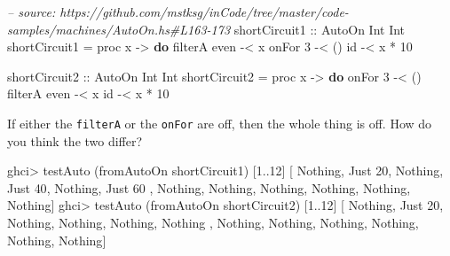 \documentclass[]{article}
\newenvironment{Shaded}{}{}
\newcommand{\KeywordTok}[1]{\textcolor[rgb]{0.00,0.44,0.13}{\textbf{{#1}}}}
\newcommand{\DataTypeTok}[1]{\textcolor[rgb]{0.56,0.13,0.00}{{#1}}}
\newcommand{\DecValTok}[1]{\textcolor[rgb]{0.25,0.63,0.44}{{#1}}}
\newcommand{\CommentTok}[1]{\textcolor[rgb]{0.38,0.63,0.69}{\textit{{#1}}}}
\newcommand{\OtherTok}[1]{\textcolor[rgb]{0.00,0.44,0.13}{{#1}}}
\newcommand{\FunctionTok}[1]{\textcolor[rgb]{0.02,0.16,0.49}{{#1}}}
\newcommand{\NormalTok}[1]{{#1}}
\begin{document}
\begin{Shaded}
\begin{Highlighting}[]
\CommentTok{-- source: https://github.com/mstksg/inCode/tree/master/code-samples/machines/AutoOn.hs#L163-173}
\OtherTok{shortCircuit1 ::} \DataTypeTok{AutoOn} \DataTypeTok{Int} \DataTypeTok{Int}
\NormalTok{shortCircuit1 }\FunctionTok{=} \NormalTok{proc x }\OtherTok{->} \KeywordTok{do}
    \NormalTok{filterA even }\FunctionTok{-<} \NormalTok{x}
    \NormalTok{onFor }\DecValTok{3}      \FunctionTok{-<} \NormalTok{()}
    \NormalTok{id           }\FunctionTok{-<} \NormalTok{x }\FunctionTok{*} \DecValTok{10}

\OtherTok{shortCircuit2 ::} \DataTypeTok{AutoOn} \DataTypeTok{Int} \DataTypeTok{Int}
\NormalTok{shortCircuit2 }\FunctionTok{=} \NormalTok{proc x }\OtherTok{->} \KeywordTok{do}
    \NormalTok{onFor }\DecValTok{3}      \FunctionTok{-<} \NormalTok{()}
    \NormalTok{filterA even }\FunctionTok{-<} \NormalTok{x}
    \NormalTok{id           }\FunctionTok{-<} \NormalTok{x }\FunctionTok{*} \DecValTok{10}
\end{Highlighting}
\end{Shaded}

If either the \texttt{filterA} or the \texttt{onFor} are off, then the
whole thing is off. How do you think the two differ?

\begin{Shaded}
\begin{Highlighting}[]
\NormalTok{ghci}\FunctionTok{>} \NormalTok{testAuto (fromAutoOn shortCircuit1) [}\DecValTok{1}\FunctionTok{..}\DecValTok{12}\NormalTok{]}
\NormalTok{[ }\DataTypeTok{Nothing}\NormalTok{, }\DataTypeTok{Just} \DecValTok{20}\NormalTok{, }\DataTypeTok{Nothing}\NormalTok{, }\DataTypeTok{Just} \DecValTok{40}\NormalTok{, }\DataTypeTok{Nothing}\NormalTok{, }\DataTypeTok{Just} \DecValTok{60}
\NormalTok{, }\DataTypeTok{Nothing}\NormalTok{, }\DataTypeTok{Nothing}\NormalTok{, }\DataTypeTok{Nothing}\NormalTok{, }\DataTypeTok{Nothing}\NormalTok{, }\DataTypeTok{Nothing}\NormalTok{, }\DataTypeTok{Nothing}\NormalTok{]}
\NormalTok{ghci}\FunctionTok{>} \NormalTok{testAuto (fromAutoOn shortCircuit2) [}\DecValTok{1}\FunctionTok{..}\DecValTok{12}\NormalTok{]}
\NormalTok{[ }\DataTypeTok{Nothing}\NormalTok{, }\DataTypeTok{Just} \DecValTok{20}\NormalTok{, }\DataTypeTok{Nothing}\NormalTok{, }\DataTypeTok{Nothing}\NormalTok{, }\DataTypeTok{Nothing}\NormalTok{, }\DataTypeTok{Nothing}
\NormalTok{, }\DataTypeTok{Nothing}\NormalTok{, }\DataTypeTok{Nothing}\NormalTok{, }\DataTypeTok{Nothing}\NormalTok{, }\DataTypeTok{Nothing}\NormalTok{, }\DataTypeTok{Nothing}\NormalTok{, }\DataTypeTok{Nothing}\NormalTok{]}
\end{Highlighting}
\end{Shaded}
\end{document}
